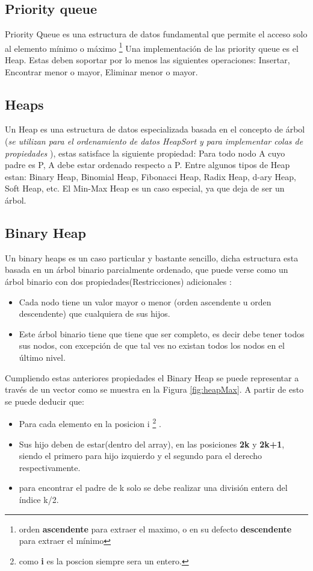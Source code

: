 \documentclass[a4paper,10pt]{article}
\begin{document}
\subsection{Priority queue}
Priority Queue es una estructura de datos fundamental que permite el acceso solo al elemento mínimo o máximo \footnote{orden \textbf{ascendente}  para extraer el maximo, o en su defecto \textbf{descendente} para extraer el mínimo} \cite{cormen}
Una implementación de las priority queue es el Heap. Estas deben soportar por lo menos las siguientes operaciones: Insertar, Encontrar menor o mayor, Eliminar menor o mayor. 


\subsection{Heaps}
Un Heap es una estructura de datos especializada basada en el concepto de árbol (\textit{se utilizan para el ordenamiento de datos \textit{HeapSort} y para implementar colas de propiedades} ), estas satisface la siguiente propiedad: Para todo nodo A cuyo padre es P, A debe estar ordenado respecto a P. Entre algunos tipos de Heap estan\cite{diapos}: Binary
Heap, Binomial Heap, Fibonacci Heap, Radix Heap, d-ary Heap, Soft Heap, etc. El Min-Max Heap es un caso especial, ya que deja de ser un árbol.



\subsection{Binary Heap}
Un binary heaps es un caso particular y bastante sencillo, dicha estructura esta basada en un árbol  binario parcialmente ordenado, que puede verse como un árbol binario con dos propiedades(Restricciones) adicionales\cite{AEDc++} :
\begin{itemize}
	\item Cada nodo tiene un valor mayor o menor 		(orden ascendente u orden descendente) que cualquiera de sus hijos.
	\item Este árbol binario tiene que tiene que ser completo, es decir debe tener todos sus nodos, con
excepción de que tal ves no existan todos los nodos en el último nivel.	
\end{itemize}
Cumpliendo estas anteriores propiedades el Binary Heap se puede representar a través de un vector como se muestra en la Figura \ref{fig:heapMax}.
A partir de esto se puede deducir que:
\begin{itemize}
	\item Para cada elemento en la posicion i \footnote{como \textbf{i} es la poscion siempre sera un entero.}  .
	\item Sus hijo deben de estar(dentro del array), en las posiciones \textbf{2k} y \textbf{2k+1}, siendo el primero para hijo izquierdo y el segundo para el derecho respectivamente.
	\item para encontrar el padre de k solo se debe realizar una división entera del índice k/2.
\end{itemize}
\end{document}
